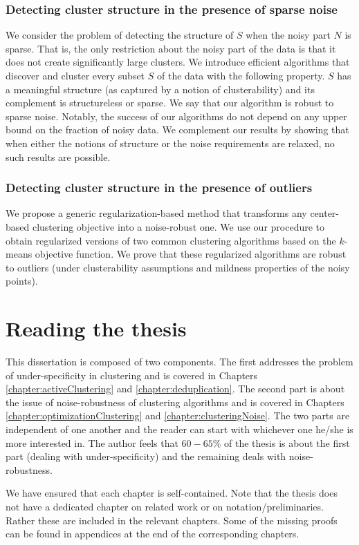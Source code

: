 \documentclass[12pt]{article}
\begin{document}
\subsubsection*{Detecting cluster structure in the presence of sparse noise}
We consider the problem of detecting the structure of $S$ when the noisy part $N$ is sparse. That is, the only restriction about the noisy part of the data is that it does not create significantly large clusters. We introduce efficient algorithms that discover and cluster every subset $S$ of the data with the following property. $S$ has a meaningful structure (as captured by a notion of clusterability) and its complement is structureless or sparse. We say that our algorithm is robust to sparse noise. Notably, the success of our algorithms do not depend on any upper bound on the fraction of noisy data. We complement our results by showing that when either the notions of structure or the noise requirements are relaxed, no such results are possible.

\subsubsection*{Detecting cluster structure in the presence of outliers}
We propose a generic regularization-based method that transforms any center-based clustering objective into a noise-robust one. We use our procedure to obtain regularized versions of two common clustering algorithms based on the $k$-means objective function. We prove that these regularized algorithms are robust to outliers (under clusterability assumptions and mildness properties of the noisy points).

\section{Reading the thesis}
This dissertation is composed of two components. The first addresses the problem of under-specificity in clustering and is covered in Chapters \ref{chapter:activeClustering} and \ref{chapter:deduplication}. The second part is about the issue of noise-robustness of clustering algorithms and is covered in Chapters \ref{chapter:optimizationClustering} and \ref{chapter:clusteringNoise}. The two parts are independent of one another and the reader can start with whichever one he/she is more interested in. The author feels that $60-65\%$ of the thesis is about the first part (dealing with under-specificity) and the remaining deals with noise-robustness. 

We have ensured that each chapter is self-contained. Note that the thesis does not have a dedicated chapter on related work or on notation/preliminaries. Rather these are included in the relevant chapters. Some of the missing proofs can be found in appendices at the end of the corresponding chapters.
  
\ifdefined\COMPLETE
\else
\end{document}
